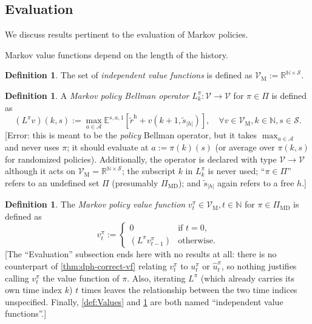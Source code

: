 \documentclass[letterpaper]{article}
\theoremstyle{plain}
\theoremstyle{definition}
\newtheorem{definition}[theorem]{Definition}
\theoremstyle{remark}
\newcommand{\Nats}{\mathbb{N}}
\newcommand{\Real}{\mathbb{R}}
\newcommand{\E}{\mathbb{E}}
\newcommand{\PiMD}{\Pi_{\mathrm{MD}}}
\newcommand{\rew}{\tilde{r}^{\mathrm{h}}}
\newcommand{\cc}[1]{\textcolor{ccolor}{[#1]}}
\newcommand{\lean}[1]{\textcolor{blue}{(\emph{LEAN}: \texttt{#1})}}
\newcommand{\leanok}{}
\begin{document}
\subsection{Evaluation}
We discuss results pertinent to the evaluation of Markov policies. 

Markov value functions depend on the length of the history.
\begin{definition} \label{def:ValuesM}
  The set of \emph{independent value functions} is defined as $\mathcal{V}_{\mathrm{M}} := \Real^{\Nats \times \mathcal{S}}$.
\end{definition}


\begin{definition}\label{def:DPMpi}
A \emph{Markov policy Bellman operator} $L_k^{\pi}\colon \mathcal{V} \to \mathcal{V}$ for $\pi\in \Pi$ is defined as
\[
(L^{\pi} v)(k, s)  :=
\max_{a\in \mathcal{A}} \E^{s, a, 1} \left[ \rew + v(k + 1, \tilde{s}_{|h|}) \right], \quad \forall v\in \mathcal{V}_{\mathrm{M}}, k\in \Nats, s\in \mathcal{S}.
\]
\cc{Error: this is meant to be the \emph{policy} Bellman operator, but it takes $\max_{a\in\mathcal{A}}$ and never uses $\pi$; it should evaluate at $a := \pi(k)(s)$ (or average over $\pi(k,s)$ for randomized policies). Additionally, the operator is declared with type $\mathcal{V}\to\mathcal{V}$ although it acts on $\mathcal{V}_{\mathrm{M}} = \Real^{\Nats\times\mathcal{S}}$; the subscript $k$ in $L^{\pi}_k$ is never used; ``$\pi\in \Pi$'' refers to an undefined set $\Pi$ (presumably $\PiMD$); and $\tilde{s}_{|h|}$ again refers to a free $h$.}
\end{definition}

\begin{definition} \label{def:v-dp-pi}
  The \emph{Markov policy value function} $v^{\pi}_t\in \mathcal{V}_{\mathrm{M}}, t \in \Nats$  for $\pi\in \PiMD$ is defined as
  \[
    v^{\pi}_t :=
    \begin{cases}
      0 &\text{if } t = 0, \\
      (L^{\pi}  v^{\pi}_{t-1}) &\text{otherwise}.
    \end{cases}
  \]
  \cc{The ``Evaluation'' subsection ends here with no results at all: there is no counterpart of \cref{thm:dph-correct-vf} relating $v^{\pi}_t$ to $u^{\pi}_t$ or $\hat{u}^{\pi}_t$, so nothing justifies calling $v^{\pi}_t$ the value function of $\pi$. Also, iterating $L^{\pi}$ (which already carries its own time index $k$) $t$ times leaves the relationship between the two time indices unspecified. Finally, \cref{def:Values} and \cref{def:ValuesM} are both named ``independent value functions''.}
\end{definition}




\end{document}
